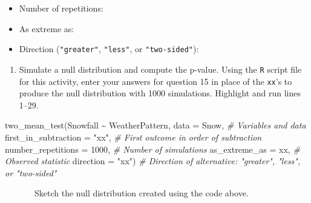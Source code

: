 \documentclass[
]{report}
\newenvironment{Shaded}{\begin{snugshade}}{\end{snugshade}}
\newcommand{\AttributeTok}[1]{\textcolor[rgb]{0.77,0.63,0.00}{#1}}
\newcommand{\CommentTok}[1]{\textcolor[rgb]{0.56,0.35,0.01}{\textit{#1}}}
\newcommand{\DecValTok}[1]{\textcolor[rgb]{0.00,0.00,0.81}{#1}}
\newcommand{\FunctionTok}[1]{\textcolor[rgb]{0.00,0.00,0.00}{#1}}
\newcommand{\NormalTok}[1]{#1}
\newcommand{\SpecialCharTok}[1]{\textcolor[rgb]{0.00,0.00,0.00}{#1}}
\newcommand{\StringTok}[1]{\textcolor[rgb]{0.31,0.60,0.02}{#1}}
\providecommand{\tightlist}{%
  \setlength{\itemsep}{0pt}\setlength{\parskip}{0pt}}
\begin{document}
\vspace{.2in}

\begin{itemize}
\tightlist
\item
  Number of repetitions:
\end{itemize}

\vspace{.2in}

\begin{itemize}
\tightlist
\item
  As extreme as:
\end{itemize}

\vspace{.2in}

\begin{itemize}
\tightlist
\item
  Direction (\texttt{"greater"}, \texttt{"less"}, or \texttt{"two-sided"}):
\end{itemize}

\vspace{.2in}

\begin{enumerate}
\def\labelenumi{\arabic{enumi}.}
\setcounter{enumi}{15}
\tightlist
\item
  Simulate a null distribution and compute the p-value. Using the \texttt{R} script file for this activity, enter your answers for question 15 in place of the \texttt{xx}'s to produce the null distribution with 1000 simulations. Highlight and run lines 1--29.
\end{enumerate}

\begin{Shaded}
\begin{Highlighting}[]
\FunctionTok{two\_mean\_test}\NormalTok{(Snowfall }\SpecialCharTok{\textasciitilde{}}\NormalTok{ WeatherPattern, }\AttributeTok{data =}\NormalTok{ Snow,  }\CommentTok{\# Variables and data}
         \AttributeTok{first\_in\_subtraction =} \StringTok{"xx"}\NormalTok{, }\CommentTok{\# First outcome in order of subtraction}
         \AttributeTok{number\_repetitions =} \DecValTok{1000}\NormalTok{,  }\CommentTok{\# Number of simulations}
         \AttributeTok{as\_extreme\_as =}\NormalTok{ xx,  }\CommentTok{\# Observed statistic}
         \AttributeTok{direction =} \StringTok{"xx"}\NormalTok{)  }\CommentTok{\# Direction of alternative: "greater", "less", or "two{-}sided"}
\end{Highlighting}
\end{Shaded}

~~~~~~~Sketch the null distribution created using the code above.
\end{document}
